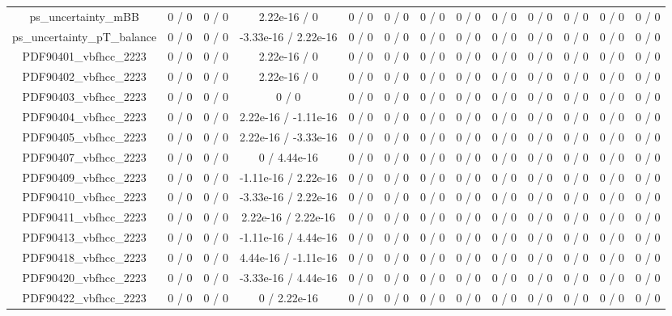 \documentclass[10pt]{article}
\begin{document}
\begin{table}[htbp]
\begin{center}
\begin{tabular}{|c|c|c|c|c|c|c|c|c|c|c|c|c|}
  ps_uncertainty_mBB & 0 / 0 & 0 / 0 & 2.22e-16 / 0 & 0 / 0 & 0 / 0 & 0 / 0 & 0 / 0 & 0 / 0 & 0 / 0 & 0 / 0 & 0 / 0 & 0 / 0 \\ 
  ps_uncertainty_pT_balance & 0 / 0 & 0 / 0 & -3.33e-16 / 2.22e-16 & 0 / 0 & 0 / 0 & 0 / 0 & 0 / 0 & 0 / 0 & 0 / 0 & 0 / 0 & 0 / 0 & 0 / 0 \\ 
  PDF90401_vbfhcc_2223 & 0 / 0 & 0 / 0 & 2.22e-16 / 0 & 0 / 0 & 0 / 0 & 0 / 0 & 0 / 0 & 0 / 0 & 0 / 0 & 0 / 0 & 0 / 0 & 0 / 0 \\ 
  PDF90402_vbfhcc_2223 & 0 / 0 & 0 / 0 & 2.22e-16 / 0 & 0 / 0 & 0 / 0 & 0 / 0 & 0 / 0 & 0 / 0 & 0 / 0 & 0 / 0 & 0 / 0 & 0 / 0 \\ 
  PDF90403_vbfhcc_2223 & 0 / 0 & 0 / 0 & 0 / 0 & 0 / 0 & 0 / 0 & 0 / 0 & 0 / 0 & 0 / 0 & 0 / 0 & 0 / 0 & 0 / 0 & 0 / 0 \\ 
  PDF90404_vbfhcc_2223 & 0 / 0 & 0 / 0 & 2.22e-16 / -1.11e-16 & 0 / 0 & 0 / 0 & 0 / 0 & 0 / 0 & 0 / 0 & 0 / 0 & 0 / 0 & 0 / 0 & 0 / 0 \\ 
  PDF90405_vbfhcc_2223 & 0 / 0 & 0 / 0 & 2.22e-16 / -3.33e-16 & 0 / 0 & 0 / 0 & 0 / 0 & 0 / 0 & 0 / 0 & 0 / 0 & 0 / 0 & 0 / 0 & 0 / 0 \\ 
  PDF90407_vbfhcc_2223 & 0 / 0 & 0 / 0 & 0 / 4.44e-16 & 0 / 0 & 0 / 0 & 0 / 0 & 0 / 0 & 0 / 0 & 0 / 0 & 0 / 0 & 0 / 0 & 0 / 0 \\ 
  PDF90409_vbfhcc_2223 & 0 / 0 & 0 / 0 & -1.11e-16 / 2.22e-16 & 0 / 0 & 0 / 0 & 0 / 0 & 0 / 0 & 0 / 0 & 0 / 0 & 0 / 0 & 0 / 0 & 0 / 0 \\ 
  PDF90410_vbfhcc_2223 & 0 / 0 & 0 / 0 & -3.33e-16 / 2.22e-16 & 0 / 0 & 0 / 0 & 0 / 0 & 0 / 0 & 0 / 0 & 0 / 0 & 0 / 0 & 0 / 0 & 0 / 0 \\ 
  PDF90411_vbfhcc_2223 & 0 / 0 & 0 / 0 & 2.22e-16 / 2.22e-16 & 0 / 0 & 0 / 0 & 0 / 0 & 0 / 0 & 0 / 0 & 0 / 0 & 0 / 0 & 0 / 0 & 0 / 0 \\ 
  PDF90413_vbfhcc_2223 & 0 / 0 & 0 / 0 & -1.11e-16 / 4.44e-16 & 0 / 0 & 0 / 0 & 0 / 0 & 0 / 0 & 0 / 0 & 0 / 0 & 0 / 0 & 0 / 0 & 0 / 0 \\ 
  PDF90418_vbfhcc_2223 & 0 / 0 & 0 / 0 & 4.44e-16 / -1.11e-16 & 0 / 0 & 0 / 0 & 0 / 0 & 0 / 0 & 0 / 0 & 0 / 0 & 0 / 0 & 0 / 0 & 0 / 0 \\ 
  PDF90420_vbfhcc_2223 & 0 / 0 & 0 / 0 & -3.33e-16 / 4.44e-16 & 0 / 0 & 0 / 0 & 0 / 0 & 0 / 0 & 0 / 0 & 0 / 0 & 0 / 0 & 0 / 0 & 0 / 0 \\ 
  PDF90422_vbfhcc_2223 & 0 / 0 & 0 / 0 & 0 / 2.22e-16 & 0 / 0 & 0 / 0 & 0 / 0 & 0 / 0 & 0 / 0 & 0 / 0 & 0 / 0 & 0 / 0 & 0 / 0 \\ 

\end{tabular}
\end{center}
\end{table}
\end{document}
